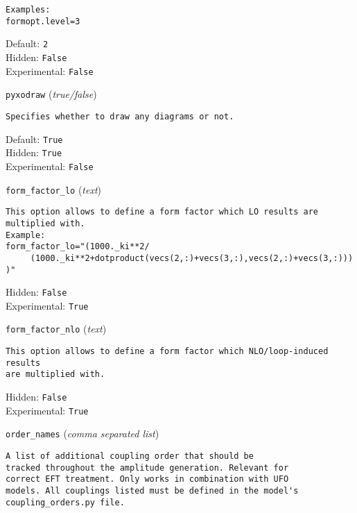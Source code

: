 \begin{basedescript}{\desclabelstyle{\pushlabel}}
\begin{verbatim}
Examples:
formopt.level=3
\end{verbatim}
Default: \verb|2|
\\Hidden: \verb|False|
\\Experimental: \verb|False|
\\\item[\colorbox{gray!30}{\texttt{pyxodraw}}] (\textit{true/false})
\begin{verbatim}
Specifies whether to draw any diagrams or not.
\end{verbatim}
Default: \verb|True|
\\Hidden: \verb|True|
\\Experimental: \verb|False|
\\\item[\colorbox{gray!30}{\texttt{form\_factor\_lo}}] (\textit{text})
\begin{verbatim}
This option allows to define a form factor which LO results are
multiplied with.
Example:
form_factor_lo="(1000._ki**2/
     (1000._ki**2+dotproduct(vecs(2,:)+vecs(3,:),vecs(2,:)+vecs(3,:)))
)"
\end{verbatim}
Hidden: \verb|False|
\\Experimental: \verb|True|
\\\item[\colorbox{gray!30}{\texttt{form\_factor\_nlo}}] (\textit{text})
\begin{verbatim}
This option allows to define a form factor which NLO/loop-induced results
are multiplied with.
\end{verbatim}
Hidden: \verb|False|
\\Experimental: \verb|True|
\\\item[\colorbox{gray!30}{\texttt{order\_names}}] (\textit{comma separated list})
\begin{verbatim}
A list of additional coupling order that should be
tracked throughout the amplitude generation. Relevant for
correct EFT treatment. Only works in combination with UFO
models. All couplings listed must be defined in the model's
coupling_orders.py file.


\end{verbatim}
\end{basedescript}
